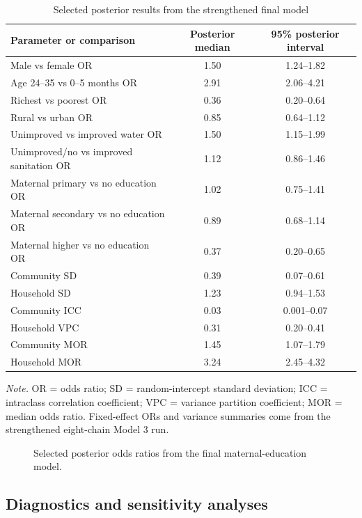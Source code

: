 \documentclass[11pt]{article}
\begin{document}
\begin{table}[H]
\centering
\caption{Selected posterior results from the strengthened final model}
\label{tab:main_bayesian_results}
\begin{tabular}{lcc}
\toprule
Parameter or comparison & Posterior median & 95\% posterior interval \\
\midrule
Male vs female OR & 1.50 & 1.24--1.82 \\
Age 24--35 vs 0--5 months OR & 2.91 & 2.06--4.21 \\
Richest vs poorest OR & 0.36 & 0.20--0.64 \\
Rural vs urban OR & 0.85 & 0.64--1.12 \\
Unimproved vs improved water OR & 1.50 & 1.15--1.99 \\
Unimproved/no vs improved sanitation OR & 1.12 & 0.86--1.46 \\
Maternal primary vs no education OR & 1.02 & 0.75--1.41 \\
Maternal secondary vs no education OR & 0.89 & 0.68--1.14 \\
Maternal higher vs no education OR & 0.37 & 0.20--0.65 \\
\addlinespace
Community SD & 0.39 & 0.07--0.61 \\
Household SD & 1.23 & 0.94--1.53 \\
Community ICC & 0.03 & 0.001--0.07 \\
Household VPC & 0.31 & 0.20--0.41 \\
Community MOR & 1.45 & 1.07--1.79 \\
Household MOR & 3.24 & 2.45--4.32 \\
\bottomrule
\end{tabular}

\begin{minipage}{0.95\textwidth}
\footnotesize
\textit{Note.} OR = odds ratio; SD = random-intercept standard deviation; ICC = intraclass correlation coefficient; VPC = variance partition coefficient; MOR = median odds ratio. Fixed-effect ORs and variance summaries come from the strengthened eight-chain Model 3 run.
\end{minipage}
\end{table}

\begin{figure}[H]
\centering

\caption{Selected posterior odds ratios from the final maternal-education model.}
\end{figure}

\subsection{Diagnostics and sensitivity analyses}
\end{document}
